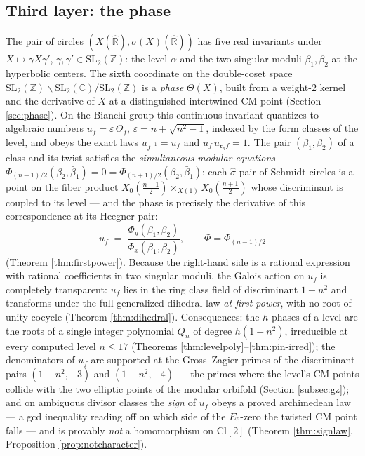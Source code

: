 \documentclass[11pt]{amsart}
\numberwithin{equation}{section}
\theoremstyle{plain}
\theoremstyle{definition}
\theoremstyle{remark}
\newcommand{\C}{\mathbb{C}}
\newcommand{\R}{\mathbb{R}}
\newcommand{\Z}{\mathbb{Z}}
\newcommand{\Rhat}{\widehat{\R}}
\newcommand{\SL}{\mathrm{SL}}
\newcommand{\Cl}{\mathrm{Cl}}
\newcommand{\idealr}{\mathfrak{r}}
\begin{document}
\subsection*{Third layer: the phase}
The pair of circles $(X(\Rhat), \sigma(X)(\Rhat))$ has five real
invariants under $X \mapsto \gamma X \gamma'$,
$\gamma, \gamma' \in \SL_2(\Z)$: the level $\alpha$ and the two singular
moduli $\beta_1, \beta_2$ at the hyperbolic centers.  The sixth
coordinate on the double-coset space
$\SL_2(\Z)\backslash\SL_2(\C)/\SL_2(\Z)$ is a \emph{phase}
$\Theta(X)$, built from a weight-$2$ kernel and the derivative of $X$ at
a distinguished intertwined CM point (Section \ref{sec:phase}).  On the
Bianchi group this continuous invariant quantizes to algebraic numbers
$u_f = \varepsilon\,\Theta_f$, $\varepsilon = n + \sqrt{n^2-1}$, indexed
by the form classes of the level, and obeys the exact laws
$u_{f^{-1}} = \bar u_f$ and $u_f\,u_{\idealr_n f} = 1$.  The pair
$(\beta_1, \beta_2)$ of a class and its twist satisfies the
\emph{simultaneous modular equations}
$\Phi_{(n-1)/2}(\beta_2, \bar\beta_1) = 0 =
\Phi_{(n+1)/2}(\beta_2, \bar\beta_1)$: each $\hat\sigma$-pair of Schmidt
circles is a point on the fiber product
$X_0(\tfrac{n-1}{2}) \times_{X(1)} X_0(\tfrac{n+1}{2})$ whose
discriminant is coupled to its level --- and the phase is precisely the
derivative of this correspondence at its Heegner pair:
\[
  u_f \;=\; \frac{\Phi_y(\beta_1, \beta_2)}{\Phi_x(\beta_1, \beta_2)},
  \qquad \Phi = \Phi_{(n-1)/2}
\]
(Theorem \ref{thm:firstpower}).  Because the right-hand side is a rational
expression with rational coefficients in two singular moduli, the Galois
action on $u_f$ is completely transparent: $u_f$ lies in the ring class
field of discriminant $1 - n^2$ and transforms under the full generalized
dihedral law \emph{at first power}, with no root-of-unity cocycle
(Theorem \ref{thm:dihedral}).  Consequences: the $h$ phases of a level are
the roots of a single integer polynomial $Q_n$ of degree $h(1-n^2)$,
irreducible at every computed level $n \le 17$ (Theorems
\ref{thm:levelpoly}--\ref{thm:pin-irred}); the denominators of $u_f$ are
supported at the Gross--Zagier primes of the discriminant pairs
$(1-n^2, -3)$ and $(1-n^2, -4)$ --- the primes where the level's CM points
collide with the two elliptic points of the modular orbifold (Section
\ref{subsec:gz}); and on ambiguous divisor classes the \emph{sign} of
$u_f$ obeys a proved archimedean law --- a gcd inequality reading off on
which side of the $E_6$-zero the twisted CM point falls --- and is
provably \emph{not} a homomorphism on $\Cl[2]$ (Theorem \ref{thm:signlaw},
Proposition \ref{prop:notcharacter}).
\end{document}
